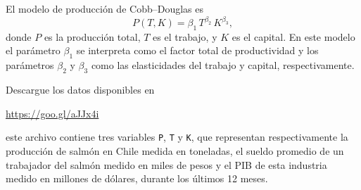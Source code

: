 El modelo de producci\'on de Cobb--Douglas es
$$
P(T,K)=\beta_1 \, T^{\beta_2} \, K^{\beta_3},
$$
donde $P$ es la producci\'on total, $T$ es el trabajo, y $K$ es el capital. En este modelo el par\'ametro $\beta_1$ se interpreta como el factor total de productividad y los par\'ametros $\beta_2$ y $\beta_3$ como las elasticidades del trabajo y capital, respectivamente.

Descargue los datos disponibles en
\begin{center}
\url{https://goo.gl/aJJx4i}
\end{center}
este archivo contiene tres variables \texttt{P}, \texttt{T} y \texttt{K}, que representan respectivamente la producci\'on de salm\'on en Chile medida en toneladas, el sueldo promedio de un trabajador del salm\'on medido en miles de pesos y el PIB de esta industria medido en millones de d\'olares, durante los \'ultimos 12 meses.


